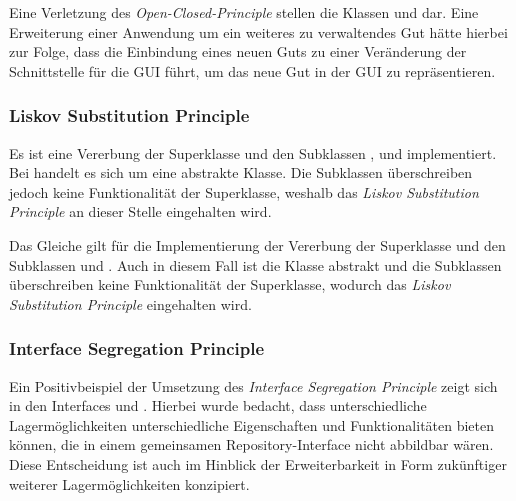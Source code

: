 Eine Verletzung des \textit{Open-Closed-Principle} stellen die Klassen \href{}{\code{}} und \href{}{\code{}} dar.
Eine Erweiterung einer Anwendung um ein weiteres zu verwaltendes Gut hätte hierbei zur Folge, dass die Einbindung eines neuen Guts zu einer Veränderung der Schnittstelle für die \ac{GUI} führt, um das neue Gut in der \ac{GUI} zu repräsentieren.


\subsubsection*{Liskov Substitution Principle}
Es ist eine Vererbung der Superklasse \href{}{\code{}} und den Subklassen \href{}{\code{}}, \href{}{\code{}} und \href{}{\code{}} implementiert.
Bei \href{}{\code{}} handelt es sich um eine abstrakte Klasse.
Die Subklassen überschreiben jedoch keine Funktionalität der Superklasse, weshalb das \textit{Liskov Substitution Principle} an dieser Stelle eingehalten wird.

Das Gleiche gilt für die Implementierung der Vererbung der Superklasse \href{}{\code{}} und den Subklassen \href{}{\code{}} und \href{}{\code{}}.
Auch in diesem Fall ist die Klasse \href{}{\code{}} abstrakt und die Subklassen überschreiben keine Funktionalität der Superklasse, wodurch das \textit{Liskov Substitution Principle} eingehalten wird.


\subsubsection*{Interface Segregation Principle}
Ein Positivbeispiel der Umsetzung des \textit{Interface Segregation Principle} zeigt sich in den Interfaces \href{}{\code{}} und \href{}{\code{}}.
Hierbei wurde bedacht, dass unterschiedliche Lagermöglichkeiten unterschiedliche Eigenschaften und Funktionalitäten bieten können, die in einem gemeinsamen Repository-Interface nicht abbildbar wären.
Diese Entscheidung ist auch im Hinblick der Erweiterbarkeit in Form zukünftiger weiterer Lagermöglichkeiten konzipiert.

